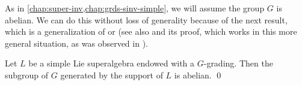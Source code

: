 As in \cref{chap:super-inv,chap:grds-sinv-simple}, we will assume the group $G$ is abelian. 
We can do this without loss of generality because of the next result, which is a generalization of \cite[Lemma 2.1]{BZ06} or \cite[Proposition 1]{MR2257580} (see also \cite[Proposition 1.12]{livromicha} and its proof, which works in this more general situation, as was observed in \cite{paper-MAP}). 

\begin{prop}\label{prop:simple-Lie-G-abelian}
    Let $L$ be a simple Lie superalgebra endowed with a $G$-grading. 
    Then the subgroup of $G$ generated by the support of $L$ is abelian. \qed
\end{prop}






